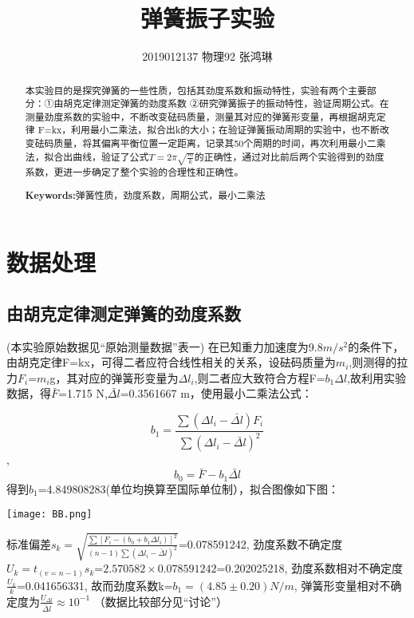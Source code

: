 \documentclass[UTF8]{ctexart}
\begin{document}
\title{弹簧振子实验}
\author{2019012137  物理92  张鸿琳}
\maketitle
\begin{abstract}
本实验目的是探究弹簧的一些性质，包括其劲度系数和振动特性，实验有两个主要部分：①由胡克定律测定弹簧的劲度系数 ②研究弹簧振子的振动特性，验证周期公式。在测量劲度系数的实验中，不断改变砝码质量，测量其对应的弹簧形变量，再根据胡克定律 F=kx，利用最小二乘法，拟合出k的大小；在验证弹簧振动周期的实验中，也不断改变砝码质量，将其偏离平衡位置一定距离，记录其50个周期的时间，再次利用最小二乘法，拟合出曲线，验证了公式$T=2\pi\sqrt{\frac{m}{k}}$的正确性，通过对比前后两个实验得到的劲度系数，更进一步确定了整个实验的合理性和正确性。



\centering
\textbf{Keywords:}弹簧性质，劲度系数，周期公式，最小二乘法
\end{abstract}

\newpage
\tableofcontents
\newpage
\section{数据处理}
\subsection{由胡克定律测定弹簧的劲度系数}
(本实验原始数据见“原始测量数据”表一)
\newline
在已知重力加速度为9.8$m/s^2$的条件下，由胡克定律F=kx，可得二者应符合线性相关的关系，设砝码质量为$m_i$,则测得的拉力$F_i$=$m_i$g，其对应的弹簧形变量为$\Delta l_i$,则二者应大致符合方程F=$b_1$$\Delta l$,故利用实验数据，得$\bar{F}$=1.715 N,$\bar{\Delta l}$=0.3561667 m，使用最小二乘法公式：

$$b_1=\frac{\sum(\Delta l_i-\bar{\Delta l})F_i}{\sum(\Delta l_i-\bar{\Delta l})^2}$$,$$b_0=\bar{F}-b_1\bar{\Delta l}$$
得到$b_1$=4.849808283(单位均换算至国际单位制），拟合图像如下图：
\begin{center} 
\texttt{[image: BB.png]} 
\end{center}

标准偏差$s_k=\sqrt{\frac{\sum [F_i-(b_0+b_1\Delta l_i)]^2}{(n-1)\sum(\Delta l_i-\bar\Delta l)^2}}$=0.078591242,
劲度系数不确定度$U_k=t_{(v=n-1)} s_k$=$2.570582\times 0.078591242$=0.202025218,
劲度系数相对不确定度$\frac{U_k}{k}$=0.041656331,
故而劲度系数k=$b_1=(4.85\pm 0.20) N/m$,
弹簧形变量相对不确定度为$\frac{U_{\Delta l}}{\bar \Delta l}\approx$$10^{-1}$
\newline
（数据比较部分见“讨论”）
\end{document}
